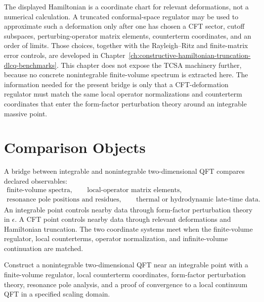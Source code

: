 The displayed Hamiltonian is a coordinate chart for relevant deformations, not
a numerical calculation.  A truncated conformal-space regulator may be used
to approximate such a deformation only after one has chosen a CFT sector,
cutoff subspaces, perturbing-operator matrix elements, counterterm
coordinates, and an order of limits.  Those choices, together with the
Rayleigh--Ritz and finite-matrix error controls, are developed in
Chapter~\ref{ch:constructive-hamiltonian-truncation-dlcq-benchmarks}.  This
chapter does not expose the TCSA machinery further, because no concrete
nonintegrable finite-volume spectrum is extracted here.  The information
needed for the present bridge is only that a CFT-deformation regulator must
match the same local operator normalizations and counterterm coordinates that
enter the form-factor perturbation theory around an integrable massive
point.

\section{Comparison Objects}

A bridge between integrable and nonintegrable two-dimensional QFT compares
declared observables:
\[
\begin{gathered}
  \text{finite-volume spectra},\qquad
  \text{local-operator matrix elements},\\
  \text{resonance pole positions and residues},\qquad
  \text{thermal or hydrodynamic late-time data}.
\end{gathered}
\]
An integrable point controls nearby data through form-factor perturbation
theory in \(\epsilon\).  A CFT point controls nearby data through relevant
deformations and Hamiltonian truncation.  The two coordinate systems meet
when the finite-volume regulator, local counterterms, operator normalization,
and infinite-volume continuation are matched.

\begin{openproblem}
\label{op:controlled-nonintegrable-deformation}
Construct a nonintegrable two-dimensional QFT near an integrable point with a
finite-volume regulator, local counterterm coordinates, form-factor
perturbation theory, resonance pole analysis, and a proof of convergence to a
local continuum QFT in a specified scaling domain.
\end{openproblem}

